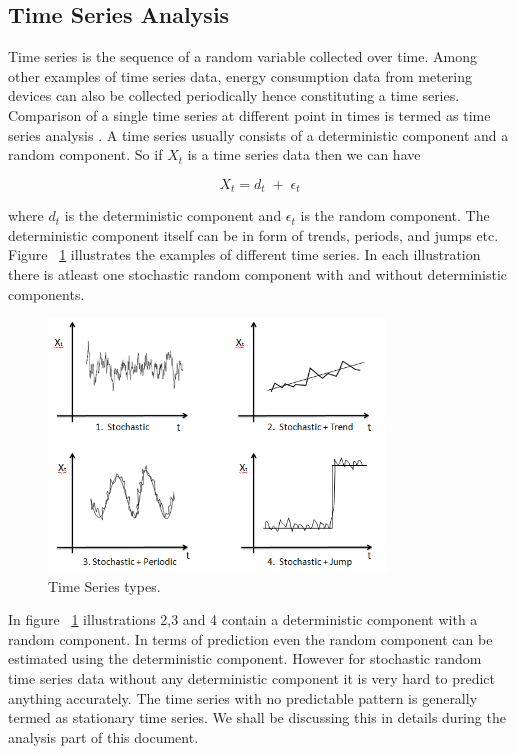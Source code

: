 \subsection{Time Series Analysis}
Time series is the sequence of a random variable collected over time. Among other examples of time series data, energy consumption data from metering devices can also be collected periodically hence constituting a time series. Comparison of a single time series at different point in times is termed as time series analysis \cite{box1976time}. A time series usually consists of a deterministic component and a random component\cite{mujumdarstochastic}. So if \(X_{t}\) is a time series data then we can have 

\begin{equation}
X_{t}= d_{t}\;+\;\epsilon_{t} 
\end{equation}  

where \(d_{t}\) is the deterministic component and \(\epsilon_{t}\) is the random component. The deterministic component itself can be in form of trends, periods, and jumps etc. Figure ~\ref{fig:time_series} illustrates the examples of different time series. In each illustration there is atleast one stochastic random component with and without deterministic components. 
\begin{figure}[ht]
  \begin{center}
    \includegraphics[width=0.8\textwidth]{images/time_series.png}
    \caption{ Time Series types\cite{mujumdarstochastic}.}
    \label{fig:time_series}
  \end{center}
\end{figure}  

In figure ~\ref{fig:time_series} illustrations 2,3 and 4 contain a deterministic component with a random component. In terms of prediction even the random component can be estimated using the deterministic component. However for stochastic random time series data without any deterministic component it is very hard to predict anything accurately. The time series with no predictable pattern is generally termed as stationary time series. We shall be discussing this in details during the  analysis part of this document.  

